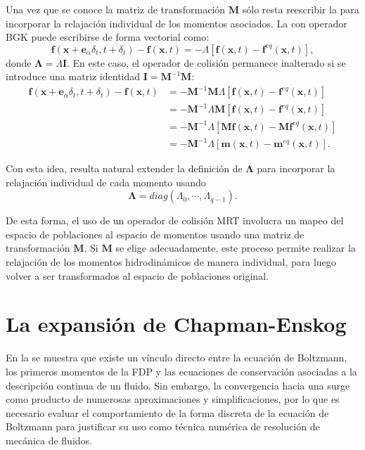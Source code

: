 Una vez que se conoce la matriz de transformaci\'on $\bm{M}$ s\'olo resta reescribir la \lbe{} para incorporar la relajaci\'on individual de los momentos asociados. La \lbe{} con operador BGK puede escribirse de forma vectorial como:
\begin{equation}
	\bm{f}(\bm{x}+\bm{e}_{\alpha}\delta_t, t+\delta_t) - \bm{f}(\bm{x},t) = -\Lambda \left[ \bm{f}(\bm{x},t) - \bm{f}^{eq}(\bm{x},t) \right],
\end{equation}
donde $\bm{\Lambda} = \Lambda \bm{I}$. En este caso, el operador de colisi\'on permanece inalterado si se introduce una matriz identidad $\bm{I}=\bm{M}^{-1}\bm{M}$:
\begin{equation}
	\begin{aligned}
		\bm{f}(\bm{x}+\bm{e}_{\alpha}\delta_t, t+\delta_t) - \bm{f}(\bm{x},t) &= -\bm{M}^{-1}\bm{M} \Lambda \left[ \bm{f}(\bm{x},t) - \bm{f}^{eq}(\bm{x},t) \right] \\
		&= -\bm{M}^{-1} \Lambda \bm{M} \left[ \bm{f}(\bm{x},t) - \bm{f}^{eq}(\bm{x},t) \right] \\
		&= -\bm{M}^{-1} \Lambda \left[ \bm{M}\bm{f}(\bm{x},t) - \bm{M}\bm{f}^{eq}(\bm{x},t) \right] \\
		&= -\bm{M}^{-1} \Lambda \left[ \bm{m}(\bm{x},t) - \bm{m}^{eq}(\bm{x},t) \right] .	
	\end{aligned}
\end{equation}

Con esta idea, resulta natural extender la definici\'on de $\bm{\Lambda}$ para incorporar la relajaci\'on individual de cada momento usando
\begin{equation}
	\bm{\Lambda}=diag(\Lambda_0, \cdots, \Lambda_{q-1}).
\end{equation}

De esta forma, el uso de un operador de colisi\'on MRT involucra un mapeo del espacio de poblaciones al espacio de momentos usando una matriz de transformaci\'on $\bm{M}$. Si $\bm{M}$ se elige adecuadamente, este proceso permite realizar la relajaci\'on de los momentos hidrodin\'amicos de manera individual, para luego volver a ser transformados al espacio de poblaciones original.




\section{La expansi\'on de Chapman-Enskog}

En la  se muestra que existe un v\'inculo directo entre la ecuaci\'on de Boltzmann, los primeros momentos de la FDP y las ecuaciones de conservaci\'on asociadas a la descripci\'on continua de un fluido. Sin embargo, la convergencia hacia una \lbe{} surge como producto de numerosas aproximaciones y simplificaciones, por lo que es necesario evaluar el comportamiento de la forma discreta de la ecuaci\'on de Boltzmann para justificar su uso como t\'ecnica num\'erica de resoluci\'on de mec\'anica de fluidos.

